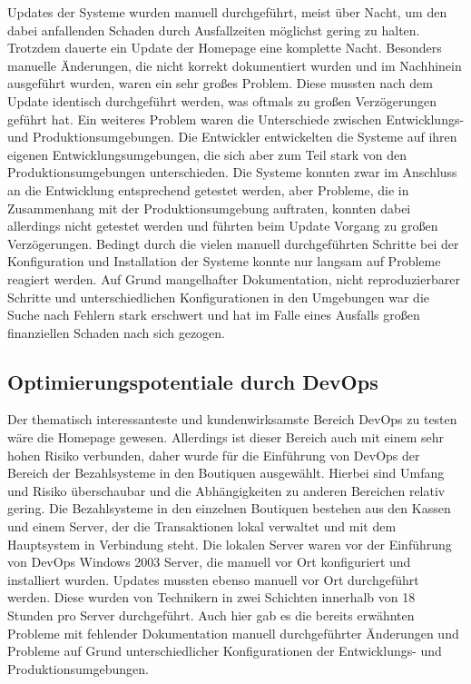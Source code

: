 Updates der Systeme wurden manuell durchgeführt, meist über Nacht, um den dabei anfallenden Schaden durch Ausfallzeiten möglichst gering zu halten. 
Trotzdem dauerte ein Update der Homepage eine komplette Nacht. 
Besonders manuelle Änderungen, die nicht korrekt dokumentiert wurden und im Nachhinein ausgeführt wurden, waren ein sehr großes Problem. 
Diese mussten nach dem Update identisch durchgeführt werden, was oftmals zu großen Verzögerungen geführt hat. 
Ein weiteres Problem waren die Unterschiede zwischen Entwicklungs- und Produktionsumgebungen. 
Die Entwickler entwickelten die Systeme auf ihren eigenen Entwicklungsumgebungen, die sich aber zum Teil stark von den Produktionsumgebungen unterschieden. 
Die Systeme konnten zwar im Anschluss an die Entwicklung entsprechend getestet werden, aber Probleme, die in Zusammenhang mit der Produktionsumgebung auftraten, konnten dabei allerdings nicht getestet werden und führten beim Update Vorgang zu großen Verzögerungen.
Bedingt durch die vielen manuell durchgeführten Schritte bei der Konfiguration und Installation der Systeme konnte nur langsam auf Probleme reagiert werden. 
Auf Grund mangelhafter Dokumentation, nicht reproduzierbarer Schritte und unterschiedlichen Konfigurationen in den Umgebungen war die Suche nach Fehlern stark erschwert und hat im Falle eines Ausfalls großen finanziellen Schaden nach sich gezogen. 
\parencite[Vgl.][S. 2 - 4]{Reed:2014}

\subsection{Optimierungspotentiale durch DevOps}
Der thematisch interessanteste und kundenwirksamste Bereich DevOps zu testen wäre die Homepage gewesen. 
Allerdings ist dieser Bereich auch mit einem sehr hohen Risiko verbunden, daher wurde für die Einführung von DevOps der Bereich der Bezahlsysteme in den Boutiquen ausgewählt. 
Hierbei sind Umfang und Risiko überschaubar und die Abhängigkeiten zu anderen Bereichen relativ gering.
Die Bezahlsysteme in den einzelnen Boutiquen bestehen aus den Kassen und einem Server, der die Transaktionen lokal verwaltet und mit dem Hauptsystem in Verbindung steht. 
Die lokalen Server waren vor der Einführung von DevOps Windows 2003 Server, die manuell vor Ort konfiguriert und installiert wurden. 
Updates mussten ebenso manuell vor Ort durchgeführt werden. Diese wurden von Technikern in zwei Schichten innerhalb von 18 Stunden pro Server durchgeführt. 
Auch hier gab es die bereits erwähnten Probleme mit fehlender Dokumentation manuell durchgeführter Änderungen und Probleme auf Grund unterschiedlicher Konfigurationen der Entwicklungs- und Produktionsumgebungen. 
\parencite[Vgl.][S. 5]{Reed:2014}

